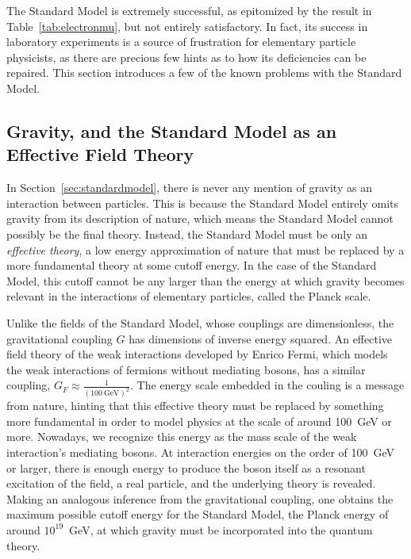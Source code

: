 The Standard Model is extremely successful, as epitomized by the result in Table~\ref{tab:electronmu}, but not entirely satisfactory.
In fact, its success in laboratory experiments is a source of frustration for elementary particle physicists, as there are precious few hints as to how its deficiencies can be repaired.
This section introduces a few of the known problems with the Standard Model.

  \subsection{Gravity, and the Standard Model as an Effective Field Theory} \label{sec:gravity}

  In Section~\ref{sec:standardmodel}, there is never any mention of gravity as an interaction between particles.
  This is because the Standard Model entirely omits gravity from its description of nature, which means the Standard Model cannot possibly be the final theory.
  Instead, the Standard Model must be only an {\it effective theory}, a low energy approximation of nature that must be replaced by a more fundamental theory at some cutoff energy.
  In the case of the Standard Model, this cutoff cannot be any larger than the energy at which gravity becomes relevant in the interactions of elementary particles, called the Planck scale.

  Unlike the fields of the Standard Model, whose couplings are dimensionless, the gravitational coupling $G$ has dimensions of inverse energy squared.
  An effective field theory of the weak interactions developed by Enrico Fermi, which models the weak interactions of fermions without mediating bosons, has a similar coupling, $G_F \approx \frac{1}{(100\mathrm{~GeV})^2}$.
  The energy scale embedded in the couling is a message from nature, hinting that this effective theory must be replaced by something more fundamental in order to model physics at the scale of around 100~GeV or more.
  Nowadays, we recognize this energy as the mass scale of the weak interaction's mediating bosons.
  At interaction energies on the order of 100~GeV or larger, there is enough energy to produce the boson itself as a resonant excitation of the field, a real particle, and the underlying theory is revealed.
  Making an analogous inference from the gravitational coupling, one obtains the maximum possible cutoff energy for the Standard Model, the Planck energy of around $10^{19}$~GeV, at which gravity must be incorporated into the quantum theory.


